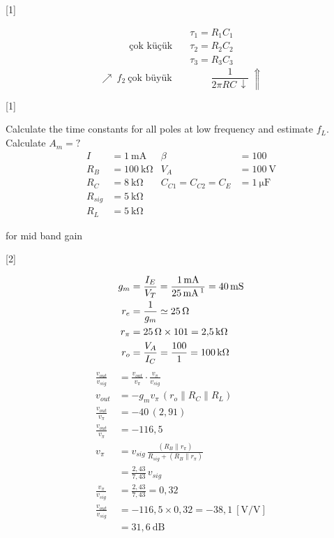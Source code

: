 \documentclass[11pt,a4paper]{article}
\begin{document}

[1]

\begin{align*}
 & \tau_1 = R_1 C_1\\
\text{çok küçük}\quad & \tau_2 = R_2 C_2\\
 & \tau_3 = R_3 C_3
\end{align*}
\[ \nearrow\ f_2\ \text{çok büyük}\qquad\qquad \frac{1}{2\pi R C\,\downarrow}\ \Uparrow \]

[1]

\begin{ornek}
Calculate the time constants for all poles at low frequency and estimate $f_L$. Calculate $A_m = ?$
\[
\begin{aligned}
I &= \qty{1}{\milli\ampere} & \beta &= 100\\
R_B &= \qty{100}{\kilo\ohm} & V_A &= \qty{100}{\volt}\\
R_C &= \qty{8}{\kilo\ohm} & C_{C1} = C_{C2} = C_E &= \qty{1}{\micro\farad}\\
R_{sig} &= \qty{5}{\kilo\ohm} & &\\
R_L &= \qty{5}{\kilo\ohm} & &
\end{aligned}
\]
\end{ornek}

for mid band gain

[2]

\begin{align*}
g_m &= \frac{I_E}{V_T} = \frac{1\,\mathrm{mA}}{25\,\mathrm{mA}\,\footnotemark} = 40\,\mathrm{mS}\\
r_e &= \frac{1}{g_m} \simeq 25\,\Omega\\
r_\pi &= 25\,\Omega \times 101 = 2{,}5\,\mathrm{k}\Omega\\
r_o &= \frac{V_A}{I_C} = \frac{100}{1} = 100\,\mathrm{k}\Omega
\end{align*}
\begin{align*}
\frac{v_{out}}{v_{sig}} &= \frac{v_{out}}{v_\pi}\cdot\frac{v_\pi}{v_{sig}}\\
v_{out} &= -g_m v_\pi\,(r_o \parallel R_C \parallel R_L)\\
\frac{v_{out}}{v_\pi} &= -40\,(2{,}91)\\
\frac{v_{out}}{v_\pi} &= -116{,}5\\
v_\pi &= v_{sig}\,\frac{(R_B \parallel r_\pi)}{R_{sig} + (R_B \parallel r_\pi)}\\
&= \frac{2{,}43}{7{,}43}\,v_{sig}\\
\frac{v_\pi}{v_{sig}} &= \frac{2{,}43}{7{,}43} = 0{,}32\\
\frac{v_{out}}{v_{sig}} &= -116{,}5 \times 0{,}32 = -38{,}1\ [\mathrm{V/V}]\\
&= 31{,}6\ \mathrm{dB}
\end{align*}
\end{document}
